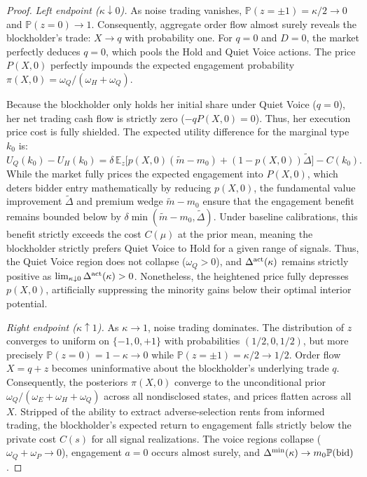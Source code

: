 \documentclass[11pt]{article}
\newcommand{\E}{\mathbb{E}}
\newcommand{\PP}{\mathbb{P}}
\newcommand{\1}{\mathbf{1}}
\begin{document}
\begin{proof}
\textit{Left endpoint ($\kappa\downarrow 0$).}
As noise trading vanishes, $\PP(z=\pm 1)=\kappa/2\to 0$ and $\PP(z=0)\to 1$. Consequently, aggregate order flow almost surely reveals the blockholder's trade: $X\to q$ with probability one. For $q=0$ and $D=0$, the market perfectly deduces $q=0$, which pools the Hold and Quiet Voice actions. The price $P(X,0)$ perfectly impounds the expected engagement probability $\pi(X,0)=\omega_Q/(\omega_H+\omega_Q)$.

Because the blockholder only holds her initial share under Quiet Voice ($q=0$), her net trading cash flow is strictly zero ($-qP(X,0)=0$). Thus, her execution price cost is fully shielded. The expected utility difference for the marginal type $k_0$ is:
\[
U_Q(k_0) - U_H(k_0) = \delta\,\E_z \big[p(X,0)(\tilde{m}-m_0) + (1-p(X,0))\tilde{\Delta}\big] - C(k_0).
\]
While the market fully prices the expected engagement into $P(X,0)$, which deters bidder entry mathematically by reducing $p(X,0)$, the fundamental value improvement $\tilde{\Delta}$ and premium wedge $\tilde{m}-m_0$ ensure that the engagement benefit remains bounded below by $\delta \min(\tilde{m}-m_0, \tilde{\Delta})$. Under baseline calibrations, this benefit strictly exceeds the cost $C(\mu)$ at the prior mean, meaning the blockholder strictly prefers Quiet Voice to Hold for a given range of signals. Thus, the Quiet Voice region does not collapse ($\omega_Q > 0$), and $\Delta^{\textup{act}}(\kappa)$ remains strictly positive as $\lim_{\kappa \downarrow 0} \Delta^{\textup{act}}(\kappa) > 0$. Nonetheless, the heightened price fully depresses $p(X,0)$, artificially suppressing the minority gains below their optimal interior potential.

\textit{Right endpoint ($\kappa\uparrow 1$).}
As $\kappa\to 1$, noise trading dominates. The distribution of $z$ converges to uniform on $\{-1,0,+1\}$ with probabilities $(1/2,0,1/2)$, but more precisely $\PP(z=0)=1-\kappa\to 0$ while $\PP(z=\pm 1)=\kappa/2\to 1/2$. Order flow $X=q+z$ becomes uninformative about the blockholder's underlying trade $q$. Consequently, the posteriors $\pi(X,0)$ converge to the unconditional prior $\omega_Q/(\omega_E+\omega_H+\omega_Q)$ across all nondisclosed states, and prices flatten across all $X$. Stripped of the ability to extract adverse-selection rents from informed trading, the blockholder's expected return to engagement falls strictly below the private cost $C(s)$ for all signal realizations. The voice regions collapse ($\omega_Q+\omega_P\to 0$), engagement $a=0$ occurs almost surely, and $\Delta^{\min}(\kappa)\to m_0\PP(\textup{bid})$.
\end{proof}
\end{document}
